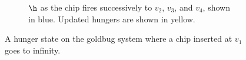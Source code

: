 \begin{remark}
\begin{figure}[htbp]
\begin{subfigure}{\textwidth}
    \caption{$\h$ as the chip fires successively to $v_2$, $v_3$, and $v_4$, shown in blue. Updated hungers are shown in yellow.}
    \label{subfig: goldbug fire 5}
    \end{subfigure}
    \caption{A hunger state on the goldbug system where a chip inserted at $v_1$ goes to infinity.}
    \label{fig:rem non-terminating goldbug}
\end{figure}
\end{remark}

